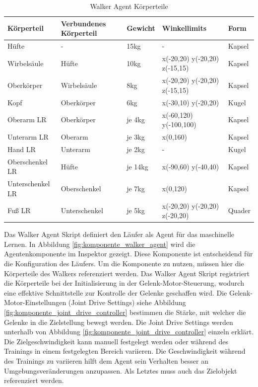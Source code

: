 \begin{table}[H]
  \centering
  {
  \begin{tabular}{ |p{3cm}|p{3cm}|p{2cm}|p{4cm}|p{2cm}| }
  \hline
  \textbf{Körpertei}l& \textbf{Verbundenes Körperteil} & \textbf{Gewicht} & \textbf{Winkellimits} & \textbf{Form} \\
  \hline
  Hüfte & - & 15kg & - & Kapsel \\
  \hline
  Wirbelsäule & Hüfte & 10kg & x(-20,20) y(-20,20) z(-15,15) & Kapsel \\
  \hline
  Oberkörper & Wirbelsäule & 8kg & x(-20,20) y(-20,20) z(-15,15) & Kapsel \\
  \hline
  Kopf & Oberkörper & 6kg & x(-30,10) y(-20,20) & Kugel \\
  \hline
  Oberarm LR & Oberkörper & je 4kg & x(-60,120) y(-100,100) & Kapsel \\
  \hline
  Unterarm LR & Oberarm & je 3kg & x(0,160) & Kapsel \\
  \hline
  Hand LR & Unterarm & je 2kg & - & Kugel \\
  \hline
  Oberschenkel LR & Hüfte & je 14kg& x(-90,60) y(-40,40) & Kapsel \\
  \hline
  Unterschenkel LR & Oberschenkel & je 7kg &  x(0,120) & Kapsel \\
  \hline
  Fuß LR & Unterschenkel & je 5kg & x(-20,20) y(-20,20) z(-20,20) & Quader \\
  \hline
  \end{tabular}}
  \caption{Walker Agent Körperteile}
  \label{table:walker_körperteile}
\end{table}

Das Walker Agent Skript definiert den Läufer als Agent für das maschinelle Lernen. In Abbildung \ref{fig:komponente_walker_agent} wird die Agentenkomponente im Inspektor gezeigt. Diese Komponente ist entscheidend für die Konfiguration des Läufers. Um die Komponente zu nutzen, müssen hier die Körperteile des Walkers referenziert werden. Das Walker Agent Skript registriert die Körperteile bei der Initialisierung in der Gelenk-Motor-Steuerung, wodurch eine effektive Schnittstelle zur Kontrolle der Gelenke geschaffen wird. Die Gelenk-Motor-Einstellungen (Joint Drive Settings) siehe Abbildung \ref{fig:komponente_joint_drive_controller} bestimmen die Stärke, mit welcher die Gelenke in die Zielstellung bewegt werden. Die Joint Drive Settings werden unterhalb von Abbildung \ref{fig:komponente_joint_drive_controller} einzeln erklärt. Die Zielgeschwindigkeit kann manuell festgelegt werden oder während des Trainings in einem festgelegten Bereich variieren. Die Geschwindigkeit während des Trainings zu variieren hilft dem Agent sein Verhalten besser an Umgebungsveränderungen anzupassen. Als Letztes muss auch das Zielobjekt referenziert werden.

